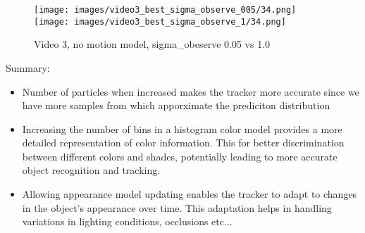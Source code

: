 \documentclass{ETHExercise}
\begin{document}
\begin{figure}[!h]
    \texttt{[image: images/video3\_best\_sigma\_observe\_005/34.png]}
  \endminipage
    \texttt{[image: images/video3\_best\_sigma\_observe\_1/34.png]}
  \endminipage
  \caption{Video 3, no motion model, sigma\_obeserve 0.05 vs 1.0}
\end{figure}

Summary:
\begin{itemize}
  \item Number of particles when increased makes the tracker more accurate
  since we have more samples from which apporximate the prediciton distribution
  \item Increasing the number of bins in a histogram color model provides a more detailed 
  representation of color information. This for better discrimination 
  between different colors and shades, potentially leading to more accurate 
  object recognition and tracking.
  \item Allowing appearance model updating enables the tracker to adapt to 
  changes in the object's appearance over time. This adaptation helps in 
  handling variations in lighting conditions, occlusions etc...
\end{itemize}
\end{document}

